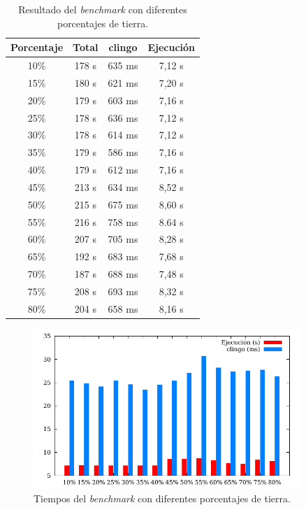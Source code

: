 \begin{table}[!h]
	\centering
	\begin{tabular}{ c c c c }
		\bfseries{Porcentaje} & \bfseries{Total}  & \bfseries{clingo} & \bfseries{Ejecución} \\
		\hline
		10\% & 178 s & 635 ms & 7,12 s \\
		15\% & 180 s & 621 ms & 7,20 s \\
		20\% & 179 s & 603 ms & 7,16 s \\
		25\% & 178 s & 636 ms & 7,12 s \\
		30\% & 178 s & 614 ms & 7,12 s \\
		35\% & 179 s & 586 ms & 7,16 s \\
		40\% & 179 s & 612 ms & 7,16 s \\
		45\% & 213 s & 634 ms & 8,52 s \\
		50\% & 215 s & 675 ms & 8,60 s \\
		55\% & 216 s & 758 ms & 8.64 s \\
		60\% & 207 s & 705 ms & 8,28 s \\
		65\% & 192 s & 683 ms & 7,68 s \\
		70\% & 187 s & 688 ms & 7,48 s \\
		75\% & 208 s & 693 ms & 8,32 s \\
		80\% & 204 s & 658 ms & 8,16 s \\
		\hline
	\end{tabular}
	\caption{Resultado del \textit{benchmark} con diferentes porcentajes de tierra.}\label{table:biomaresult}
\end{table}

\begin{figure}[!h]
	\centering
	\includegraphics[width=0.9\textwidth]{tables/bioma-size.pdf}
	\caption{Tiempos del \textit{benchmark} con diferentes porcentajes de tierra.}\label{fig:biomaresult}
\end{figure}

